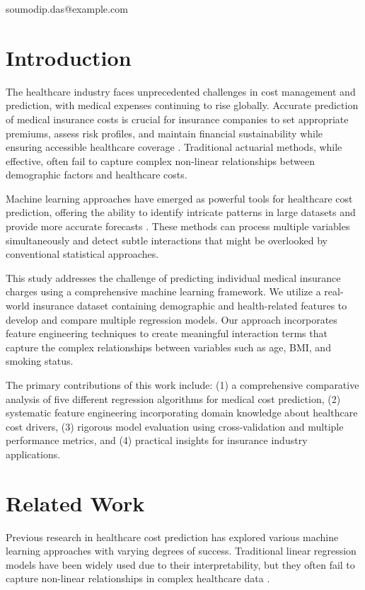 \documentclass[times, twoside, watermark]{zHenriquesLab-StyleBioRxiv}
\begin{document}
\begin{corrauthor}
soumodip.das@example.com
\end{corrauthor}

\section*{Introduction}

The healthcare industry faces unprecedented challenges in cost management and prediction, with medical expenses continuing to rise globally. Accurate prediction of medical insurance costs is crucial for insurance companies to set appropriate premiums, assess risk profiles, and maintain financial sustainability while ensuring accessible healthcare coverage \cite{Brownlee2016}. Traditional actuarial methods, while effective, often fail to capture complex non-linear relationships between demographic factors and healthcare costs.

Machine learning approaches have emerged as powerful tools for healthcare cost prediction, offering the ability to identify intricate patterns in large datasets and provide more accurate forecasts \cite{Hastie2009}. These methods can process multiple variables simultaneously and detect subtle interactions that might be overlooked by conventional statistical approaches.

This study addresses the challenge of predicting individual medical insurance charges using a comprehensive machine learning framework. We utilize a real-world insurance dataset containing demographic and health-related features to develop and compare multiple regression models. Our approach incorporates feature engineering techniques to create meaningful interaction terms that capture the complex relationships between variables such as age, BMI, and smoking status.

The primary contributions of this work include: (1) a comprehensive comparative analysis of five different regression algorithms for medical cost prediction, (2) systematic feature engineering incorporating domain knowledge about healthcare cost drivers, (3) rigorous model evaluation using cross-validation and multiple performance metrics, and (4) practical insights for insurance industry applications.

\section*{Related Work}

Previous research in healthcare cost prediction has explored various machine learning approaches with varying degrees of success. Traditional linear regression models have been widely used due to their interpretability, but they often fail to capture non-linear relationships in complex healthcare data \cite{James2013}.
\end{document}
